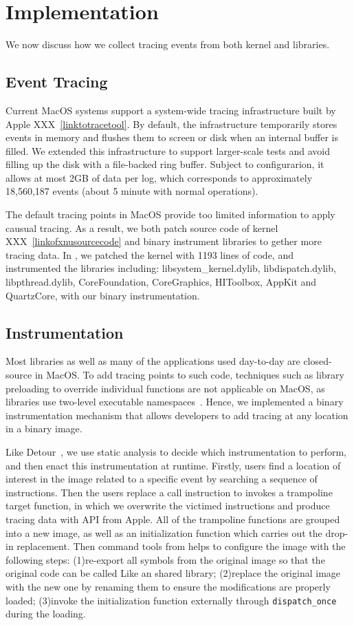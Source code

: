 \section{Implementation}\label{sec:implementation}
We now discuss how we collect tracing events from both kernel and libraries.

\subsection{Event Tracing}
Current MacOS systems support a system-wide tracing infrastructure built by
Apple XXX~\ref{linktotracetool}. By default, the infrastructure temporarily stores
events in memory and flushes them to screen or disk when an internal buffer is
filled. We extended this infrastructure to support larger-scale tests and avoid
filling up the disk with a file-backed ring buffer. Subject to configurarion,
it allows at most 2GB of data per log, which corresponds to approximately
18,560,187 events (about 5 minute with normal operations).

The default tracing points in MacOS provide too limited information to
apply causual tracing. As a result, we both patch source code of kernel
XXX~\ref{linkofxnusourcecode} and binary instrument libraries to gether
more tracing data. In \xxx, we patched the kernel with 1193 lines of
code, and instrumented the libraries including: libsystem\_kernel.dylib,
libdispatch.dylib, libpthread.dylib, CoreFoundation, CoreGraphics, HIToolbox,
AppKit and QuartzCore, with our binary instrumentation.

\subsection{Instrumentation}
Most libraries as well as many of the applications used day-to-day are
closed-source in MacOS. To add tracing points to such code, techniques such as
library preloading to override individual functions are not applicable on MacOS,
as libraries use two-level executable namespaces~\cite{}. Hence, we implemented
a binary instrumentation mechanism that allows developers to add tracing at
any location in a binary image.

Like Detour~\cite{hunt1999detours}, we use static analysis to decide which
instrumentation to perform, and then enact this instrumentation at runtime.
Firstly, users find a location of interest in the image related to a specific
event by searching a sequence of instructions. Then the users replace a call
instruction to invokes a trampoline target function, in which we overwrite the
victimed instructions and produce tracing data with API from Apple. All of the
trampoline functions are grouped into a new image, as well as an initialization
function which carries out the drop-in replacement. Then command tools from
\xxx helps to configure the image with the following steps: (1)re-export all
symbols from the original image so that the original code can be called Like an
shared library; (2)replace the original image with the new one by renaming them
to ensure the modifications are properly loaded; (3)invoke the initialization
function externally through \texttt{dispatch\_once} during the loading.

